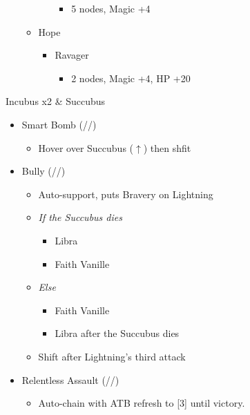 \begin{multicols}{2}
\begin{menu}
\begin{itemize}
\begin{itemize}
\begin{itemize}
            \begin{itemize}
                \item 5 nodes, Magic +4
            \end{itemize}
        \end{itemize}
        \item Hope
        \begin{itemize}
            \item Ravager
            \begin{itemize}
                \item 2 nodes, Magic +4, HP +20
            \end{itemize}
        \end{itemize}
    \end{itemize}
\end{itemize}
\end{menu}

\renewcommand{\first}{[1] Relentless Assault (\rav/\com/\rav)}
\renewcommand{\second}{[2] Bully (\syn/\com/\sab)}
\renewcommand{\third}{[3] Relentless Assault (\rav/\com/\rav)}
\renewcommand{\fourth}{[4] Smart Bomb (\rav/\rav/\sab)}
\renewcommand{\fifth}{[5] Tri-Disaster (\rav/\rav/\rav)}
\renewcommand{\sixth}{[6] Malevolence (\syn/\rav/\rav)}

\begin{battle}{Incubus x2 \& Succubus}
\begin{itemize}
    \item \fourth
    \begin{itemize}
        \item Hover over Succubus ($\uparrow$) then shfit
    \end{itemize}
    \item \second
    \begin{itemize}
        \item Auto-support, puts Bravery on Lightning
        \item \textit{If the Succubus dies}
        \begin{itemize}
            \item Libra
            \item Faith Vanille
        \end{itemize}
        \item \textit{Else}
        \begin{itemize}
            \item Faith Vanille
            \item Libra after the Succubus dies
        \end{itemize}
        \item Shift after Lightning's third attack
    \end{itemize}
    \item \first
    \begin{itemize}
        \item Auto-chain with ATB refresh to [3] until victory.
    \end{itemize}
\end{itemize}
 
\end{battle}
\end{multicols}
